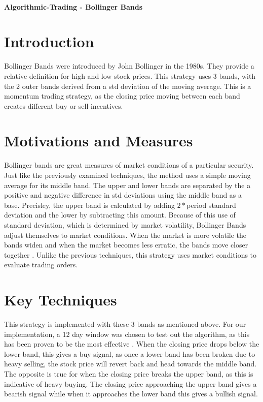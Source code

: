 \documentclass[letterpaper,11pt]{article}
\begin{document}
\thispagestyle{plain}


 \\

\noindent\textbf{Algorithmic-Trading - Bollinger Bands}

\section*{Introduction }

Bollinger Bands were introduced by John Bollinger in the 1980s. They provide a relative definition for high and low stock prices. This strategy uses 3 bands, with the 2 outer bands derived from a std deviation of the moving average. This is a momentum trading strategy, as the closing price moving between each band creates different buy or sell incentives. 

\section*{Motivations and Measures}

Bollinger bands are great measures of market conditions of a particular security. Just like the previously examined techniques, the method uses a simple moving average for its middle band. The upper and lower bands are separated by the a positive and negative difference in std deviations using the middle band as a base. Precisley, the upper band is calculated by adding $2 * $period standard deviation and the lower by subtracting this amount. Because of this use of standard deviation, which is determined by market volatility, Bollinger Bands adjust themselves to market conditions. When the market is more volatile the bands widen and when the market becomes less erratic, the bands move closer together \cite{Liu2006}. Unlike the previous techniques, this strategy uses market conditions to evaluate trading orders.

\section*{Key Techniques}

This strategy is implemented with these 3 bands as mentioned above. For our implementation, a 12 day window was chosen to test out the algorithm, as this has been proven to be the most effective \cite{Liu2006}. When the closing price drops below the lower band, this gives a buy signal, as once a lower band has been broken due to heavy selling, the stock price will revert back and head towards the middle band. The opposite is true for when the closing price breaks the upper band, as this is indicative of heavy buying. The closing price approaching the upper band gives a bearish signal while when it approaches the lower band this gives a bullish signal.
\end{document}
